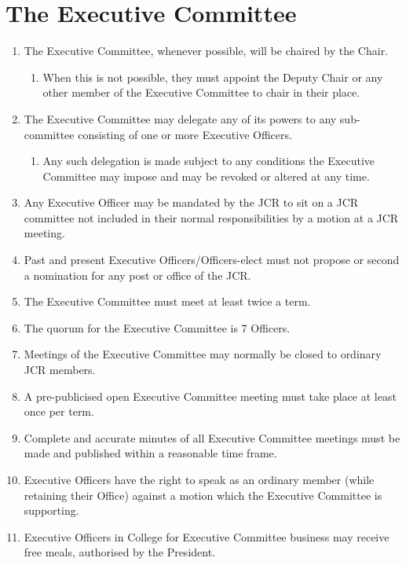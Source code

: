 \documentclass[12pt]{article}
\begin{document}
\section{The Executive Committee}
\begin{enumerate}
    \item The Executive Committee, whenever possible, will be chaired by the Chair.
    \begin{enumerate}
        \item When this is not possible, they must appoint the Deputy Chair or any other member of the Executive Committee to chair in their place.
    \end{enumerate}
    \item The Executive Committee may delegate any of its powers to any sub-committee consisting of one or more Executive Officers.
    \begin{enumerate}
        \item Any such delegation is made subject to any conditions the Executive Committee may impose and may be revoked or altered at any time.
    \end{enumerate}
    \item Any Executive Officer may be mandated by the JCR to sit on a JCR committee not included in their normal responsibilities by a motion at a JCR meeting.
    \item Past and present Executive Officers/Officers-elect must not propose or second a nomination for any post or office of the JCR.
    \item The Executive Committee must meet at least twice a term.
    \item The quorum for the Executive Committee is 7 Officers.
    \item Meetings of the Executive Committee may normally be closed to ordinary JCR members.
    \item A pre-publicised open Executive Committee meeting must take place at least once per term.
    \item Complete and accurate minutes of all Executive Committee meetings must be made and published within a reasonable time frame.
    \item Executive Officers have the right to speak as an ordinary member (while retaining their Office) against a motion which the Executive Committee is supporting.
    \item Executive Officers in College for Executive Committee business may receive free meals, authorised by the President.
\end{enumerate}
\newpage
\end{document}
